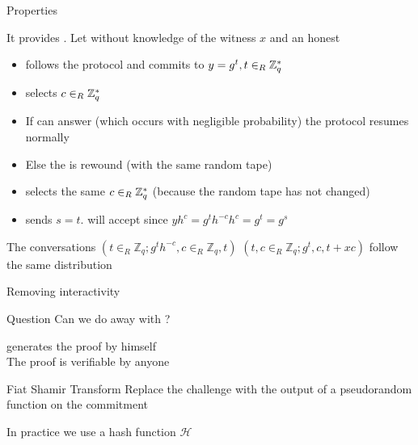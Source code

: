 \documentclass[handout]{beamer}
\begin{document}
\begin{frame}[allowframebreaks]{Properties}
\framebreak

It provides . Let  \siml without knowledge of the witness $x$ and an honest \ver 
 
\begin{itemize}
\item \siml follows the protocol and commits to $y=g^t, t \in_R \mathbb{Z}^*_{q}$  
\item \ver selects $c \in_R \mathbb{Z}^*_{q}$  
\item If \siml can answer (which occurs with negligible probability) the protocol resumes normally    
\item Else the \ver is rewound (with the same random tape)    
\item \ver selects the same $c \in_R \mathbb{Z}^*_{q}$ (because the random tape has not changed)   
\item \siml sends $s=t$. \ver will accept since $yh^{c} = g^t  h^{-c} h^{c} = g^t = g^s$  
\end{itemize}
  
The conversations $(t \in_R \mathbb{Z}_q; g^t h^{-c}   , c \in_R \mathbb{Z}_q  , t )$ 
$(t,c \in_R \mathbb{Z}_q;  g^t  , c  , t+xc  )$
 follow the same distribution
\end{frame}
 

\begin{frame}{Removing interactivity}
\begin{block}{Question}
Can we do away with \ver?
\end{block}
\pause
\prv generates the proof by himself \\
\pause
The proof is verifiable by anyone
\pause
\begin{block}{Fiat Shamir Transform}
Replace the challenge with the output of a pseudorandom function on the commitment

In practice we use a hash function $\mathcal{H}$
\end{block}
\end{frame}
\end{document}

